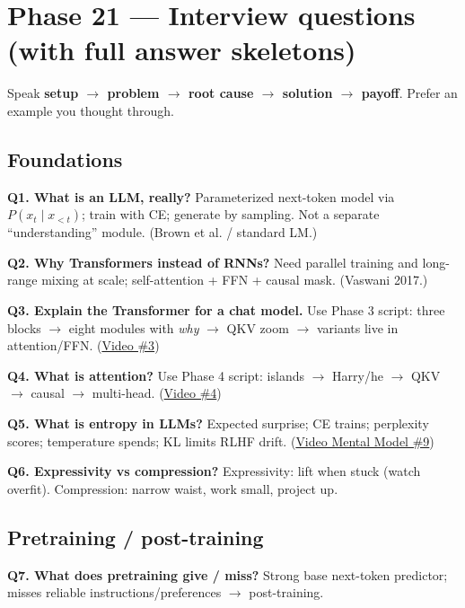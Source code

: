 \documentclass[11pt,a4paper]{article}
\begin{document}
{{\bigskip


\clearpage
\section{Phase 21 --- Interview questions (with full answer skeletons)}


Speak \textbf{setup $\rightarrow$ problem $\rightarrow$ root cause $\rightarrow$ solution $\rightarrow$ payoff}. Prefer an example you thought through.


\subsection{Foundations}


\textbf{Q1. What is an LLM, really?}   Parameterized next-token model via \(P(x_t\mid x_{<t})\); train with CE; generate by sampling. Not a separate ``understanding'' module. (Brown et al. / standard LM.)


\textbf{Q2. Why Transformers instead of RNNs?}   Need parallel training and long-range mixing at scale; self-attention + FFN + causal mask. (Vaswani 2017.)


\textbf{Q3. Explain the Transformer for a chat model.}   Use Phase 3 script: three blocks $\rightarrow$ eight modules with \textit{why} $\rightarrow$ QKV zoom $\rightarrow$ variants live in attention/FFN. (\href{https://www.youtube.com/watch?v=c533te7NSpI}{Video \#3})


\textbf{Q4. What is attention?}   Use Phase 4 script: islands $\rightarrow$ Harry/he $\rightarrow$ QKV $\rightarrow$ causal $\rightarrow$ multi-head. (\href{https://www.youtube.com/watch?v=cquX2tOODUI}{Video \#4})


\textbf{Q5. What is entropy in LLMs?}   Expected surprise; CE trains; perplexity scores; temperature spends; KL limits RLHF drift. (\href{https://www.youtube.com/watch?v=q3agYqgqklU}{Video Mental Model \#9})


\textbf{Q6. Expressivity vs compression?}   Expressivity: lift when stuck (watch overfit). Compression: narrow waist, work small, project up.


\subsection{Pretraining / post-training}


\textbf{Q7. What does pretraining give / miss?}   Strong base next-token predictor; misses reliable instructions/preferences $\rightarrow$ post-training.


}}
\end{document}
